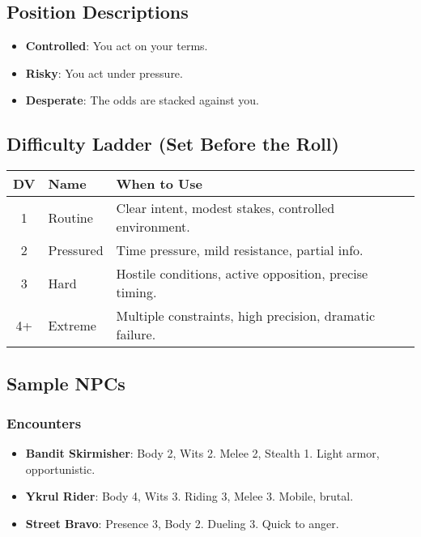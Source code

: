 \subsection*{Position Descriptions}

\begin{itemize}
    \item \textbf{Controlled}: You act on your terms.
    \item \textbf{Risky}: You act under pressure.
    \item \textbf{Desperate}: The odds are stacked against you.
\end{itemize}

\subsection*{Difficulty Ladder (Set Before the Roll)}

\begin{center}
\begin{tabular}{cll}
\toprule
\textbf{DV} & \textbf{Name} & \textbf{When to Use} \\
\midrule
1 & Routine\index{Difficulty Value!Routine} & Clear intent, modest stakes, controlled environment. \\
2 & Pressured\index{Difficulty Value!Pressured} & Time pressure, mild resistance, partial info. \\
3 & Hard\index{Difficulty Value!Hard} & Hostile conditions, active opposition, precise timing. \\
4+ & Extreme\index{Difficulty Value!Extreme} & Multiple constraints, high precision, dramatic failure. \\
\bottomrule
\end{tabular}
\end{center}

\subsection*{Sample NPCs}

\subsubsection*{Encounters}

\begin{itemize}
    \item \textbf{Bandit Skirmisher}: Body 2, Wits 2. Melee 2, Stealth 1. Light armor, opportunistic.
    \item \textbf{Ykrul Rider}: Body 4, Wits 3. Riding 3, Melee 3. Mobile, brutal.
    \item \textbf{Street Bravo}: Presence 3, Body 2. Dueling 3. Quick to anger.
\end{itemize}

